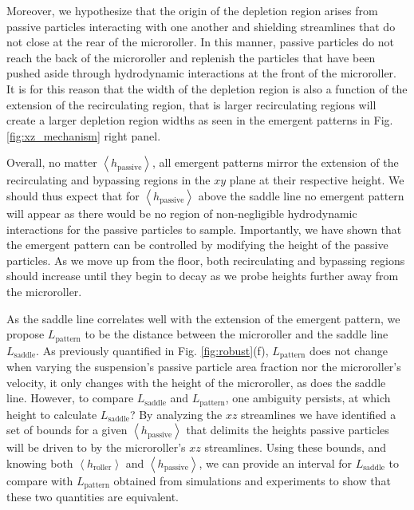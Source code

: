 \documentclass[12pt]{article}
\begin{document}
Moreover, we hypothesize that the origin of the depletion region arises from passive particles interacting with one another and shielding streamlines that do not close at the rear of the microroller. In this manner, passive particles do not reach the back of the microroller and replenish the particles that have been pushed aside through hydrodynamic interactions at the front of the microroller. It is for this reason that the width of the depletion region is also a function of the extension of the recirculating region, that is larger recirculating regions will create a larger depletion region widths as seen in the emergent patterns in Fig. \ref{fig:xz_mechanism} right panel.  

Overall, no matter $\left < h_\mathrm{passive} \right > $, all emergent patterns mirror the extension of the recirculating and bypassing regions in the $xy$ plane at their respective height. We should thus expect that for $\left < h_\mathrm{passive} \right > $ above the saddle line no emergent pattern will appear as there would be no region of non-negligible hydrodynamic interactions for the passive particles to sample. Importantly, we have shown that the emergent pattern can be controlled by modifying the height of the passive particles. As we move up from the floor, both recirculating and bypassing regions should increase until they begin to decay as we probe heights further away from the microroller. 



As the saddle line correlates well with the extension of the emergent pattern, we propose $L_\mathrm{pattern}$ to be the distance between the microroller and the saddle line $L_\mathrm{saddle}$. As previously quantified in Fig. \ref{fig:robust}(f), $L_\mathrm{pattern}$ does not change when varying the suspension's passive particle area fraction nor the microroller's velocity, it only changes with the height of the microroller, as does the saddle line. However, to compare $L_\mathrm{saddle}$ and $L_\mathrm{pattern}$, one ambiguity persists, at which height to calculate $L_\mathrm{saddle}$? By analyzing the $xz$ streamlines we have identified a set of bounds for a given $\left < h_\mathrm{passive} \right >$ that delimits the heights passive particles will be driven to by the microroller's $xz$ streamlines. Using these bounds, and knowing both $\left < h_\mathrm{roller} \right >$ and $\left < h_\mathrm{passive} \right >$, we can provide an interval for $L_\mathrm{saddle}$ to compare with $L_\mathrm{pattern}$ obtained from simulations and experiments to show that these two quantities are equivalent. 
\end{document}
